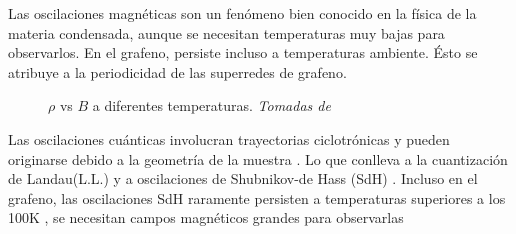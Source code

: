 \begin{frame}
	Las oscilaciones magnéticas son un fenómeno bien conocido en la física de la materia condensada, aunque se necesitan temperaturas muy bajas para observarlos. En el grafeno, persiste incluso a temperaturas ambiente. Ésto se atribuye a la periodicidad de las superredes de grafeno\cite{Kumar2017}.

	\begin{figure}
	\caption{$\rho$ vs $B$ a diferentes temperaturas. \textit{Tomadas de \cite{Kumar2017}}}
	\end{figure}
\end{frame}

\begin{frame}
	\begin{multicols}{2}
		Las oscilaciones cuánticas involucran trayectorias ciclotrónicas y pueden originarse debido a la geometría de la muestra \cite{Chen2014}. Lo que conlleva a la cuantización de Landau(L.L.) y a oscilaciones de Shubnikov-de Hass (SdH) \cite{Fujita2014}.
		Incluso en el grafeno, las oscilaciones SdH raramente persisten a temperaturas superiores a los 100K \cite{Kishigi2014}, se necesitan campos magnéticos grandes para observarlas \cite{Novoselov2007}
	\end{multicols}
\end{frame}


